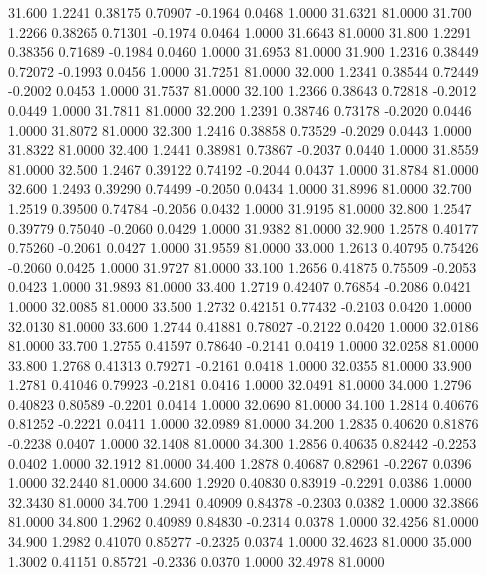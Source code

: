   31.600   1.2241   0.38175   0.70907  -0.1964   0.0468   1.0000  31.6321  81.0000
  31.700   1.2266   0.38265   0.71301  -0.1974   0.0464   1.0000  31.6643  81.0000
  31.800   1.2291   0.38356   0.71689  -0.1984   0.0460   1.0000  31.6953  81.0000
  31.900   1.2316   0.38449   0.72072  -0.1993   0.0456   1.0000  31.7251  81.0000
  32.000   1.2341   0.38544   0.72449  -0.2002   0.0453   1.0000  31.7537  81.0000
  32.100   1.2366   0.38643   0.72818  -0.2012   0.0449   1.0000  31.7811  81.0000
  32.200   1.2391   0.38746   0.73178  -0.2020   0.0446   1.0000  31.8072  81.0000
  32.300   1.2416   0.38858   0.73529  -0.2029   0.0443   1.0000  31.8322  81.0000
  32.400   1.2441   0.38981   0.73867  -0.2037   0.0440   1.0000  31.8559  81.0000
  32.500   1.2467   0.39122   0.74192  -0.2044   0.0437   1.0000  31.8784  81.0000
  32.600   1.2493   0.39290   0.74499  -0.2050   0.0434   1.0000  31.8996  81.0000
  32.700   1.2519   0.39500   0.74784  -0.2056   0.0432   1.0000  31.9195  81.0000
  32.800   1.2547   0.39779   0.75040  -0.2060   0.0429   1.0000  31.9382  81.0000
  32.900   1.2578   0.40177   0.75260  -0.2061   0.0427   1.0000  31.9559  81.0000
  33.000   1.2613   0.40795   0.75426  -0.2060   0.0425   1.0000  31.9727  81.0000
  33.100   1.2656   0.41875   0.75509  -0.2053   0.0423   1.0000  31.9893  81.0000
  33.400   1.2719   0.42407   0.76854  -0.2086   0.0421   1.0000  32.0085  81.0000
  33.500   1.2732   0.42151   0.77432  -0.2103   0.0420   1.0000  32.0130  81.0000
  33.600   1.2744   0.41881   0.78027  -0.2122   0.0420   1.0000  32.0186  81.0000
  33.700   1.2755   0.41597   0.78640  -0.2141   0.0419   1.0000  32.0258  81.0000
  33.800   1.2768   0.41313   0.79271  -0.2161   0.0418   1.0000  32.0355  81.0000
  33.900   1.2781   0.41046   0.79923  -0.2181   0.0416   1.0000  32.0491  81.0000
  34.000   1.2796   0.40823   0.80589  -0.2201   0.0414   1.0000  32.0690  81.0000
  34.100   1.2814   0.40676   0.81252  -0.2221   0.0411   1.0000  32.0989  81.0000
  34.200   1.2835   0.40620   0.81876  -0.2238   0.0407   1.0000  32.1408  81.0000
  34.300   1.2856   0.40635   0.82442  -0.2253   0.0402   1.0000  32.1912  81.0000
  34.400   1.2878   0.40687   0.82961  -0.2267   0.0396   1.0000  32.2440  81.0000
  34.600   1.2920   0.40830   0.83919  -0.2291   0.0386   1.0000  32.3430  81.0000
  34.700   1.2941   0.40909   0.84378  -0.2303   0.0382   1.0000  32.3866  81.0000
  34.800   1.2962   0.40989   0.84830  -0.2314   0.0378   1.0000  32.4256  81.0000
  34.900   1.2982   0.41070   0.85277  -0.2325   0.0374   1.0000  32.4623  81.0000
  35.000   1.3002   0.41151   0.85721  -0.2336   0.0370   1.0000  32.4978  81.0000
